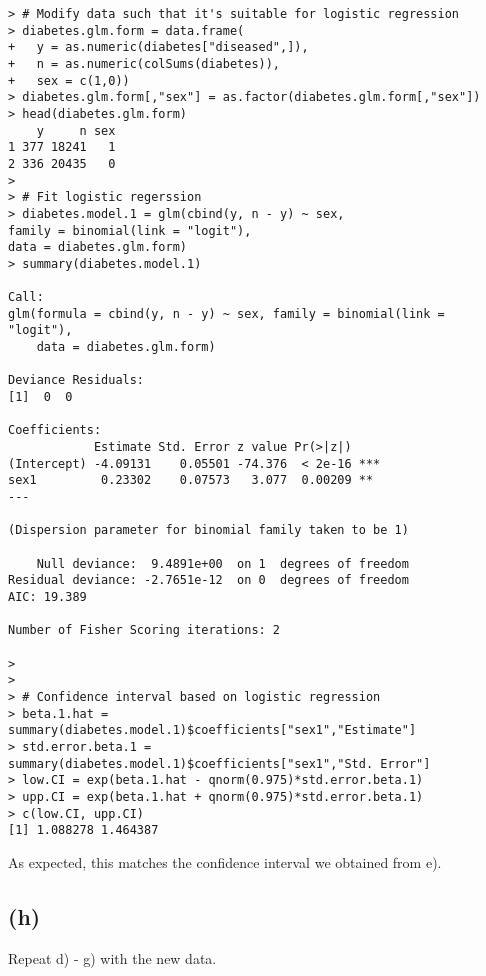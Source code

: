 \begin{lstlisting}
> # Modify data such that it's suitable for logistic regression
> diabetes.glm.form = data.frame(
+   y = as.numeric(diabetes["diseased",]),
+   n = as.numeric(colSums(diabetes)),
+   sex = c(1,0))
> diabetes.glm.form[,"sex"] = as.factor(diabetes.glm.form[,"sex"])
> head(diabetes.glm.form)
    y     n sex
1 377 18241   1
2 336 20435   0
> 
> # Fit logistic regerssion
> diabetes.model.1 = glm(cbind(y, n - y) ~ sex, 
family = binomial(link = "logit"), 
data = diabetes.glm.form)
> summary(diabetes.model.1)

Call:
glm(formula = cbind(y, n - y) ~ sex, family = binomial(link = "logit"), 
    data = diabetes.glm.form)

Deviance Residuals: 
[1]  0  0

Coefficients:
            Estimate Std. Error z value Pr(>|z|)    
(Intercept) -4.09131    0.05501 -74.376  < 2e-16 ***
sex1         0.23302    0.07573   3.077  0.00209 ** 
---

(Dispersion parameter for binomial family taken to be 1)

    Null deviance:  9.4891e+00  on 1  degrees of freedom
Residual deviance: -2.7651e-12  on 0  degrees of freedom
AIC: 19.389

Number of Fisher Scoring iterations: 2

> 
> 
> # Confidence interval based on logistic regression
> beta.1.hat = summary(diabetes.model.1)$coefficients["sex1","Estimate"]
> std.error.beta.1 = summary(diabetes.model.1)$coefficients["sex1","Std. Error"]
> low.CI = exp(beta.1.hat - qnorm(0.975)*std.error.beta.1)
> upp.CI = exp(beta.1.hat + qnorm(0.975)*std.error.beta.1)
> c(low.CI, upp.CI)
[1] 1.088278 1.464387
\end{lstlisting}

As expected, this matches the confidence interval we obtained from e).\\

\vspace{\baselineskip}
\subsection*{(h)}
Repeat d) - g) with the new data.